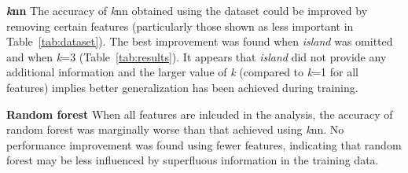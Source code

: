 \documentclass[a4paper, 11pt]{article}
\begin{document}
\textbf{\textit{k}nn}  
The accuracy of \textit{k}nn obtained using the dataset could be improved by removing certain features 
(particularly those shown as less important in Table~\ref{tab:dataset}).
The best improvement was found when \textit{island} was omitted and when \textit{k}=3 (Table~\ref{tab:results}). It appears that \textit{island} did not provide 
any additional information and the larger value of \textit{k} (compared to \textit{k}=1 for all features) implies better generalization has been achieved during training.

\textbf{Random forest}  
When all features are inlcuded in the analysis, the accuracy of random forest was marginally worse 
than that achieved using \textit{k}nn. 
No performance improvement was found using fewer features, indicating that random forest
may be less influenced by superfluous information in the training data. 
\end{document}
